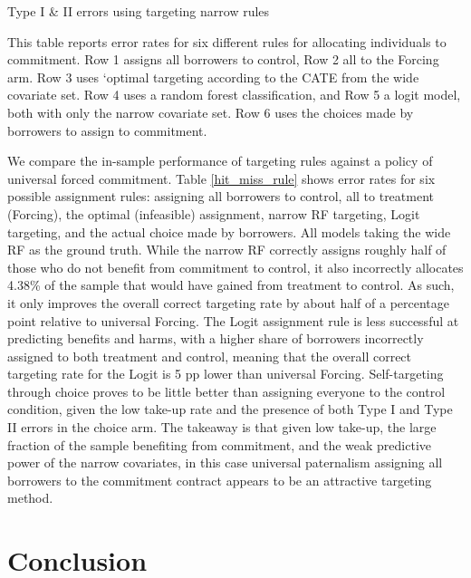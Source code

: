 \documentclass[12pt, a4paper]{article}
\begin{document}
\begin{table}
\caption{Type I \& II errors using targeting narrow rules}
\label{hit_miss_rule}
\begin{center}
\footnotesize{}
\end{center}
\scriptsize{This table reports error rates for six different rules for allocating individuals to commitment. Row 1 assigns all borrowers to control, Row 2 all to the Forcing arm. Row 3 uses `optimal targeting according to the CATE from the wide covariate set. Row 4 uses a random forest classification, and Row 5 a logit model, both with only the narrow covariate set.  Row 6 uses the choices made by borrowers to assign to commitment.}
\end{table} 

We compare the in-sample performance of targeting rules against a policy of universal forced commitment. Table \ref{hit_miss_rule} shows error rates for six possible assignment rules: assigning all borrowers to control, all to treatment (Forcing), the optimal (infeasible) assignment, narrow RF targeting, Logit targeting, and the actual choice made by borrowers.  All models taking the wide RF as the ground truth. While the narrow RF correctly assigns roughly half of those who do not benefit from commitment to control, it also incorrectly allocates 4.38\% of the sample that would have gained from treatment to control. As such, it only improves the overall correct targeting rate by about half of a percentage point relative to universal Forcing. The Logit assignment rule is less successful at predicting benefits and harms, with a higher share of borrowers incorrectly assigned to both treatment and control, meaning that the overall correct targeting rate for the Logit is 5 pp lower than universal Forcing.  Self-targeting through choice proves to be little better than assigning everyone to the control condition, given the low take-up rate and the presence of both Type I and Type II errors in the choice arm.  The takeaway is that given low take-up, the large fraction of the sample benefiting from commitment, and the weak predictive power of the narrow covariates, in this case universal paternalism assigning all borrowers to the commitment contract appears to be an attractive targeting method.

    
\section{Conclusion} \label{conclusion}
\end{document}
